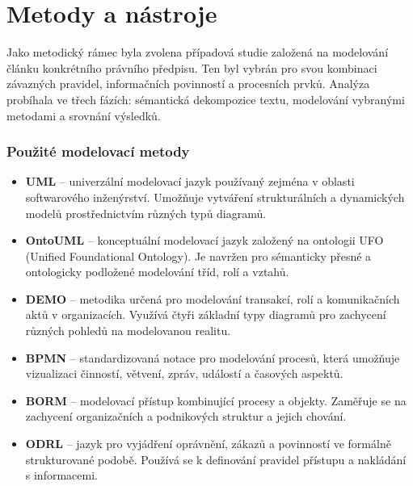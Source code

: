 
\section{Metody a nástroje}
\label{sec:metody-a-nástroje}
Jako metodický rámec byla zvolena případová studie založená na modelování článku konkrétního právního předpisu. Ten byl vybrán pro svou kombinaci závazných pravidel, informačních povinností a procesních prvků. Analýza probíhala ve třech fázích: sémantická dekompozice textu, modelování vybranými metodami a srovnání výsledků.


\subsubsection{Použité modelovací metody}
\label{sec:použité-modelovací-metody}
\begin{itemize}
  \item \textbf{UML} – univerzální modelovací jazyk používaný zejména v oblasti softwarového inženýrství. Umožňuje vytváření strukturálních a dynamických modelů prostřednictvím různých typů diagramů.
  \item \textbf{OntoUML} – konceptuální modelovací jazyk založený na ontologii UFO (Unified Foundational Ontology). Je navržen pro sémanticky přesné a ontologicky podložené modelování tříd, rolí a vztahů.
  \item \textbf{DEMO} – metodika určená pro modelování transakcí, rolí a komunikačních aktů v organizacích. Využívá čtyři základní typy diagramů pro zachycení různých pohledů na modelovanou realitu.
  \item \textbf{BPMN} – standardizovaná notace pro modelování procesů, která umožňuje vizualizaci činností, větvení, zpráv, událostí a časových aspektů.
  \item \textbf{BORM} – modelovací přístup kombinující procesy a objekty. Zaměřuje se na zachycení organizačních a podnikových struktur a jejich chování.
  \item \textbf{ODRL} – jazyk pro vyjádření oprávnění, zákazů a povinností ve formálně strukturované podobě. Používá se k definování pravidel přístupu a nakládání s informacemi.
\end{itemize}

